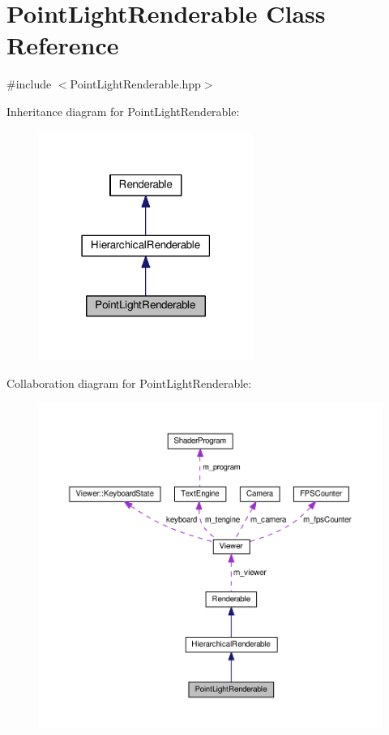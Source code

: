 \hypertarget{classPointLightRenderable}{\section{Point\+Light\+Renderable Class Reference}
\label{classPointLightRenderable}
}


{\ttfamily \#include $<$Point\+Light\+Renderable.\+hpp$>$}



Inheritance diagram for Point\+Light\+Renderable\+:\nopagebreak
\begin{figure}[H]
\begin{center}
\leavevmode
\includegraphics[width=198pt]{classPointLightRenderable__inherit__graph}
\end{center}
\end{figure}


Collaboration diagram for Point\+Light\+Renderable\+:\nopagebreak
\begin{figure}[H]
\begin{center}
\leavevmode
\includegraphics[width=350pt]{classPointLightRenderable__coll__graph}
\end{center}
\end{figure}
